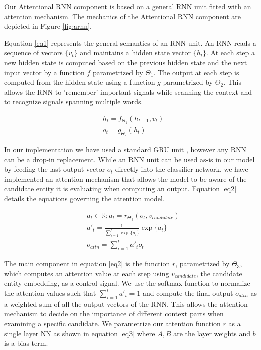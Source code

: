 \documentclass[11pt]{article}
\begin{document}
Our Attentional RNN component is based on a general RNN unit fitted with an attention mechanism. The mechanics of the Attentional RNN component are depicted in Figure \ref{fig:arnn}. 

Equation \ref{eq1} represents the general semantics of an RNN unit. An RNN reads a sequence of vectors $\{v_t\}$ and maintains a hidden state vector $\{h_t\}$. At each step a new hidden state is computed based on the previous hidden state and the next input vector by a function $f$ parametrized by $\Theta_1$. The output at each step is computed from the hidden state using a function $g$ parametrized by $\Theta_2$. This allows the RNN to 'remember' important signals while scanning the context and to recognize signals spanning multiple words.

\begin{equation}
\label{eq1}
\begin{aligned}
& h_t=f_{\Theta_1}(h_{t-1}, v_t) \\
& o_t=g_{\Theta_2}(h_t)
\end{aligned}
\end{equation}

In our implementation we have used a standard GRU unit \cite{cho2014learning}, however any RNN can be a drop-in replacement. While an RNN unit can be used as-is in our model by feeding the last output vector $o_t$ directly into the classifier network, we have implemented an attention mechanism that allows the model to be aware of the candidate entity it is evaluating when computing an output. Equation \ref{eq2} details the equations governing the attention model.

\begin{equation}
\label{eq2}
\begin{aligned}
& a_t \in \mathbb{R}; a_t=r_{\Theta_3}(o_t, v_{candidate}) \\
& a'_t  = \frac{1}{\sum_{i=1}^{t} \exp\{a_i\}} \exp \{a_t\} \\
& o_{attn}=\sum_{i=1}^{t} a'_t o_t
\end{aligned}
\end{equation}

The main component in equation \ref{eq2} is the function $r$, parametrized by $\Theta_3$, which computes an attention value at each step using $v_{candidate}$, the candidate entity embedding, as a control signal. We use the softmax function to normalize the attention values such that $\sum_{i=1}^{t} a'_i = 1$ and compute the final output $o_{attn}$ as a weighted sum of all the output vectors of the RNN. This allows the attention mechanism to decide on the importance of different context parts when examining a specific candidate. We parametrize our attention function $r$ as a single layer NN as shown in equation \ref{eq3} where $A, B$ are the layer weights and $b$ is a bias term.
\end{document}
